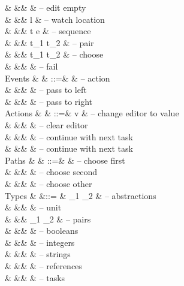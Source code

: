 \begin{grammar}
    &        &\mid& \Empty \tau                 & – edit empty \\
    &        &\mid& \Watch l                    & – watch location \\
    &        &\mid& t \Seq e                    & – sequence \\
    &        &\mid& t_1 \And t_2                & – pair \\
    &        &\mid& t_1 \Or t_2                 & – choose \\
    &        &\mid& \Fail                       & – fail \\
  Events
    & \eta   & ::=& \alpha                      & – action \\
    &        &\mid& \Left \eta                  & – pass to left \\
    &        &\mid& \Right \eta                 & – pass to right \\
  Actions
    & \alpha & ::=& v                           & – change editor to value \\
    &        &\mid& \Clear                      & – clear editor \\
    &        &\mid& \Pick \pi                   & – continue with next task \\
    &        &\mid& \Execute \pi                & – continue with next task \\
  Paths
    & \pi    & ::=& \First                      & – choose first \\
    &        &\mid& \Second                     & – choose second \\
    &        &\mid& \Other \pi                  & – choose other \\
  Types
    & \tau   &::= & \tau_1 \to \tau_2           & – abstractions \\
    &        &\mid& \Unit                       & – unit \\
    &        &\mid& \tau_1 \times \tau_2        & – pairs \\
    &        &\mid& \Bool                       & – booleans \\
    &        &\mid& \Int                        & – integers \\
    &        &\mid& \String                     & – strings \\
    &        &\mid& \Reference \tau             & – references \\
    &        &\mid& \Task \tau                  & – tasks \\
\end{grammar}



